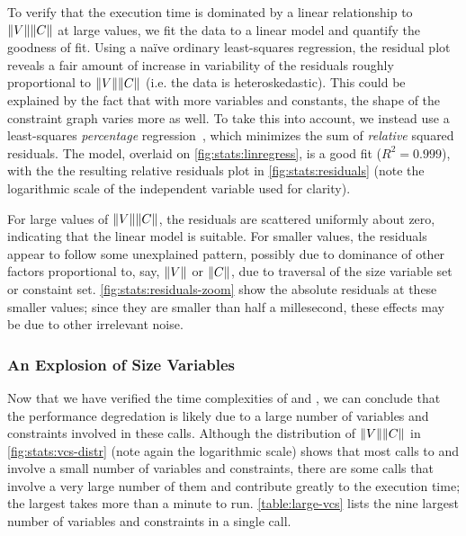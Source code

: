 To verify that the execution time is dominated by a linear relationship to $\lVert V\rVert\lVert C\rVert$ at large values, we fit the data to a linear model and quantify the goodness of fit.
Using a na\"ive ordinary least-squares regression, the residual plot reveals a fair amount of increase in variability of the residuals roughly proportional to $\lVert V\rVert\lVert C\rVert$ (i.e. the data is heteroskedastic).
This could be explained by the fact that with more variables and constants, the shape of the constraint graph varies more as well.
To take this into account, we instead use a least-squares \emph{percentage} regression~\citep{lspr},
which minimizes the sum of \emph{relative} squared residuals.
The model, overlaid on \autoref{fig:stats:linregress}, is a good fit ($R^2 = 0.999$), with the the resulting relative residuals plot in \autoref{fig:stats:residuals}
(note the logarithmic scale of the independent variable used for clarity).

For large values of $\lVert V\rVert\lVert C\rVert$, the residuals are scattered uniformly about zero, indicating that the linear model is suitable.
For smaller values, the residuals appear to follow some unexplained pattern,
possibly due to dominance of other factors proportional to, say, $\lVert V\rVert$ or $\lVert C\rVert$, due to traversal of the size variable set or constaint set.
\autoref{fig:stats:residuals-zoom} show the absolute residuals at these smaller values;
since they are smaller than half a millesecond, these effects may be due to other irrelevant noise.

\subsubsection{An Explosion of Size Variables}

Now that we have verified the time complexities of \solve and \RecCheck,
we can conclude that the performance degredation is likely due to a large number of variables and constraints involved in these calls.
Although the distribution of $\lVert V\rVert\lVert C\rVert$ in \autoref{fig:stats:vcs-distr} (note again the logarithmic scale) shows that most calls to \solve and \RecCheck involve a small number of variables and constraints,
there are some calls that involve a very large number of them and contribute greatly to the execution time;
the largest takes more than a minute to run.
\autoref{table:large-vcs} lists the nine largest number of variables and constraints in a single call.

